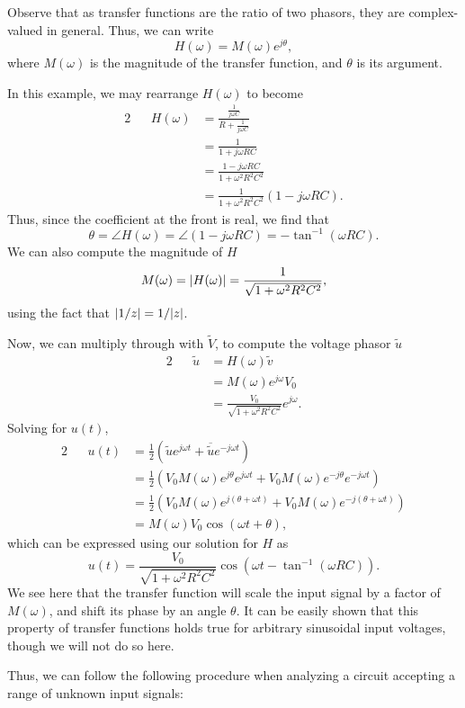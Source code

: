 \documentclass[letterpaper]{article}
\theoremstyle{remark}
\renewcommand{\tilde}[1]{\widetilde{#1}}
\DeclarePairedDelimiter\abs{\lvert}{\rvert}%
\newcommand{\eqn}[1]{\begin{alignat*}{2}#1\end{alignat*}}
\begin{document}
Observe that as transfer functions are the ratio of two phasors, they are complex-valued in general. Thus, we can write
\[
    H(\omega) = M(\omega) e^{j \theta},
\]
where $M(\omega)$ is the magnitude of the transfer function, and $\theta$ is its argument.

In this example, we may rearrange $H(\omega)$ to become
\eqn{
    && H(\omega) &= \frac{\frac{1}{j\omega C}}{R + \frac{1}{j\omega C}} \\
    &&&= \frac{1}{1 + j\omega RC} \\
    &&&= \frac{1 - j\omega RC}{1 + \omega^2R^2C^2} \\
    &&&= \frac{1}{1 + \omega^2R^2C^2} (1 - j\omega RC).
}
Thus, since the coefficient at the front is real, we find that
\[
    \theta = \angle H(\omega) = \angle(1 - j\omega RC) = -\tan^{-1}(\omega RC).
\]
We can also compute the magnitude of $H$
\[
    M(\omega) = \abs{H(\omega)} = \frac{1}{\sqrt{1 + \omega^2 R^2C^2}},
\]
using the fact that $\abs{1/z} = 1 / \abs{z}$.

Now, we can multiply through with $\tilde{V}$, to compute the voltage phasor $\tilde{u}$
\eqn{
    && \tilde{u} &= H(\omega) \tilde{v} \\
    &&&= M(\omega) e^{j\omega} V_0 \\
    &&&= \frac{V_0}{\sqrt{1 + \omega^2R^2C^2}} e^{j\omega}.
}
Solving for $u(t)$,
\eqn{
    && u(t) &= \frac{1}{2} \left( \tilde{u}e^{j\omega t} + \overline{\tilde{u}}e^{-j\omega t} \right) \\
    &&&= \frac{1}{2} \left(V_0M(\omega) e^{j\theta} e^{j\omega t} + V_0M(\omega) e^{-j\theta} e^{-j\omega t} \right) \\
    &&&= \frac{1}{2} \left(V_0M(\omega) e^{j(\theta + \omega t)} + V_0M(\omega) e^{-j(\theta + \omega t)} \right) \\
    &&&= M(\omega) V_0 \cos{(\omega t + \theta)},
}
which can be expressed using our solution for $H$ as
\[
    u(t) = \frac{V_0}{\sqrt{1 + \omega^2 R^2C^2}} \cos{(\omega t -\tan^{-1}(\omega RC))}.
\]
We see here that the transfer function will scale the input signal by a factor of $M(\omega)$, and shift its phase by an angle $\theta$. It can be easily shown that this property of transfer functions holds true for arbitrary sinusoidal input voltages, though we will not do so here.

Thus, we can follow the following procedure when analyzing a circuit accepting a range of unknown input signals:
\end{document}
